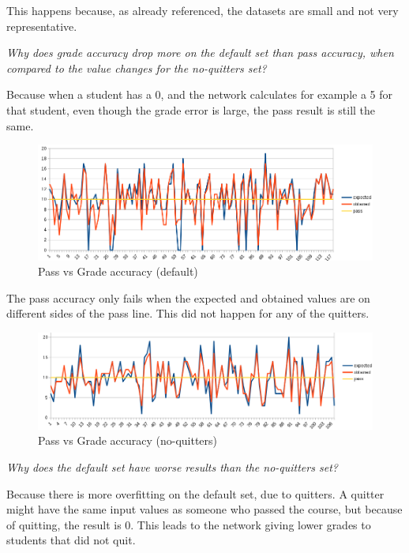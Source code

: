 \documentclass[11pt]{article}
\begin{document}
This happens because, as already referenced, the datasets are small and not very representative.

\newpage
\textit{Why does grade accuracy drop more on the default set than pass accuracy, when compared to the value changes for the no-quitters set?}

Because when a student has a 0, and the network calculates for example a 5 for that student, even though the grade error is large, the pass result is still the same.

\begin{figure}[H]
\label{fig:Pass vs Grade}
\includegraphics[scale=0.6]{passgrade.png}
\centering
\caption{Pass vs Grade accuracy (default)}
\end{figure}

The pass accuracy only fails when the expected and obtained values are on different sides of the pass line. This did not happen for any of the quitters.

\begin{figure}[H]
\label{fig:Pass vs Grade}
\includegraphics[scale=0.6]{passgradenoquit.png}
\centering
\caption{Pass vs Grade accuracy (no-quitters)}
\end{figure}

\textit{Why does the default set have worse results than the no-quitters set?}

Because there is more overfitting on the default set, due to quitters. A quitter might have the same input values as someone who passed the course, but because of quitting, the result is 0. This leads to the network giving lower grades to students that did not quit.
\end{document}
